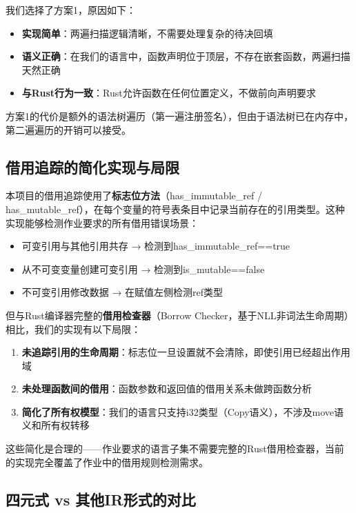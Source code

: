 \documentclass[12pt,a4paper]{ctexart}
\begin{document}
我们选择了方案1，原因如下：
\begin{itemize}
    \item \textbf{实现简单}：两遍扫描逻辑清晰，不需要处理复杂的待决回填
    \item \textbf{语义正确}：在我们的语言中，函数声明位于顶层，不存在嵌套函数，两遍扫描天然正确
    \item \textbf{与Rust行为一致}：Rust允许函数在任何位置定义，不做前向声明要求
\end{itemize}

方案1的代价是额外的语法树遍历（第一遍注册签名），但由于语法树已在内存中，第二遍遍历的开销可以接受。

\subsection{借用追踪的简化实现与局限}

本项目的借用追踪使用了\textbf{标志位方法}（has\_immutable\_ref / has\_mutable\_ref），在每个变量的符号表条目中记录当前存在的引用类型。这种实现能够检测作业要求的所有借用错误场景：

\begin{itemize}
    \item 可变引用与其他引用共存 → 检测到has\_immutable\_ref==true
    \item 从不可变变量创建可变引用 → 检测到is\_mutable==false
    \item 不可变引用修改数据 → 在赋值左侧检测ref类型
\end{itemize}

但与Rust编译器完整的\textbf{借用检查器}（Borrow Checker，基于NLL非词法生命周期）相比，我们的实现有以下局限：

\begin{enumerate}
    \item \textbf{未追踪引用的生命周期}：标志位一旦设置就不会清除，即使引用已经超出作用域
    \item \textbf{未处理函数间的借用}：函数参数和返回值的借用关系未做跨函数分析
    \item \textbf{简化了所有权模型}：我们的语言只支持i32类型（Copy语义），不涉及move语义和所有权转移
\end{enumerate}

这些简化是合理的——作业要求的语言子集不需要完整的Rust借用检查器，当前的实现完全覆盖了作业中的借用规则检测需求。

\subsection{四元式 vs 其他IR形式的对比}
\end{document}

